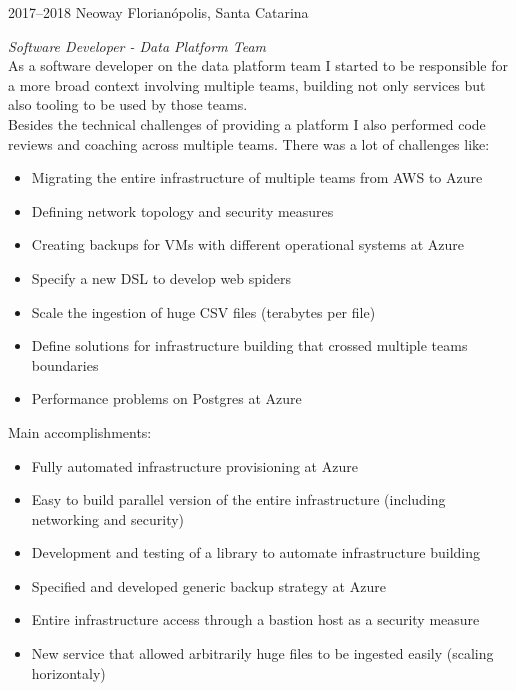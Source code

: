 \documentclass[]{friggeri-cv} %
\begin{document}
\begin{entrylist}
\entry
{2017--2018}
{Neoway}
{Florianópolis, Santa Catarina}
{\emph{Software Developer - Data Platform Team} \\

    As a software developer on the data platform team I started to be
    responsible for a more broad context involving multiple teams, building not
    only services but also tooling to be used by those teams. \\
    Besides the technical challenges of providing a platform I also performed
    code reviews and coaching across multiple teams.
    There was a lot of challenges like:\\

\begin{itemize}
    \item Migrating the entire infrastructure of multiple teams from AWS to Azure
    \item Defining network topology and security measures
    \item Creating backups for VMs with different operational systems at Azure
    \item Specify a new DSL to develop web spiders
    \item Scale the ingestion of huge CSV files (terabytes per file)
    \item Define solutions for infrastructure building that crossed multiple teams boundaries
    \item Performance problems on Postgres at Azure
\end{itemize}

Main accomplishments:

\begin{itemize}
    \item Fully automated infrastructure provisioning at Azure
    \item Easy to build parallel version of the entire infrastructure (including networking and security)
    \item Development and testing of a library to automate infrastructure building
    \item Specified and developed generic backup strategy at Azure
    \item Entire infrastructure access through a bastion host as a security measure
    \item New service that allowed arbitrarily huge files to be ingested easily (scaling horizontaly)
\end{itemize}
}
\end{entrylist}
\end{document}
